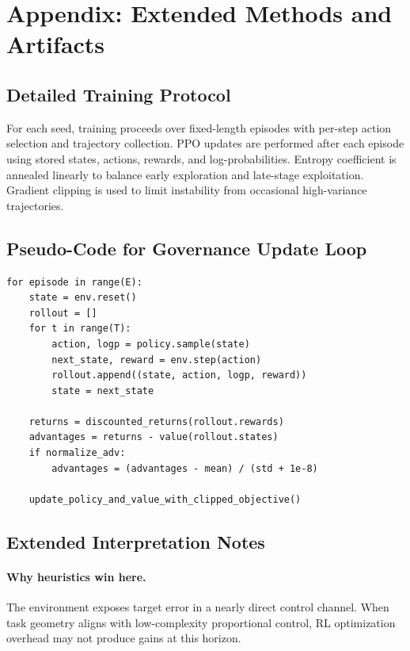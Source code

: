 \section{Appendix: Extended Methods and Artifacts}

\subsection{Detailed Training Protocol}

For each seed, training proceeds over fixed-length episodes with per-step action selection and trajectory collection. PPO updates are performed after each episode using stored states, actions, rewards, and log-probabilities. Entropy coefficient is annealed linearly to balance early exploration and late-stage exploitation. Gradient clipping is used to limit instability from occasional high-variance trajectories.

\subsection{Pseudo-Code for Governance Update Loop}

\begin{verbatim}
for episode in range(E):
    state = env.reset()
    rollout = []
    for t in range(T):
        action, logp = policy.sample(state)
        next_state, reward = env.step(action)
        rollout.append((state, action, logp, reward))
        state = next_state

    returns = discounted_returns(rollout.rewards)
    advantages = returns - value(rollout.states)
    if normalize_adv:
        advantages = (advantages - mean) / (std + 1e-8)

    update_policy_and_value_with_clipped_objective()
\end{verbatim}

\subsection{Extended Interpretation Notes}

\paragraph{Why heuristics win here.}
The environment exposes target error in a nearly direct control channel. When task geometry aligns with low-complexity proportional control, RL optimization overhead may not produce gains at this horizon.

